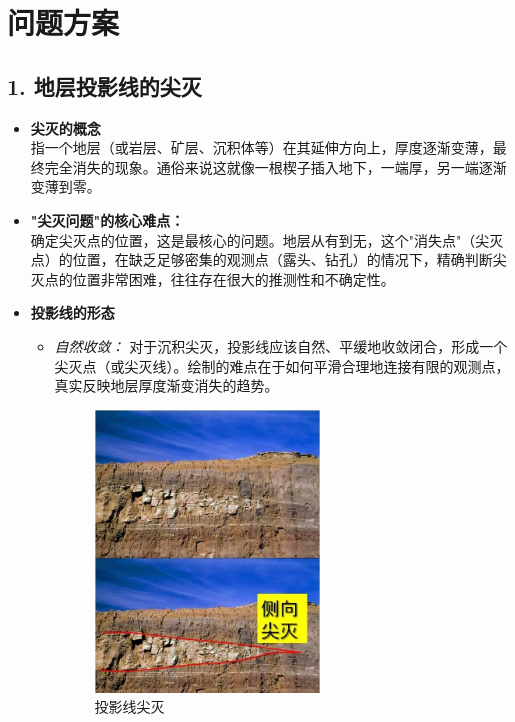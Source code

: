 \documentclass[a4paper,twoside]{ctexart}
\begin{document}
\section{问题方案}
\subsection*{1. 地层投影线的尖灭}
\begin{itemize}
  \item \textbf{尖灭的概念}\\
  指一个地层（或岩层、矿层、沉积体等）在其延伸方向上，厚度逐渐变薄，最终完全消失的现象。通俗来说这就像一根楔子插入地下，一端厚，另一端逐渐变薄到零。
  
  \item \textbf{"尖灭问题"的核心难点：}\\
  确定尖灭点的位置，这是最核心的问题。地层从有到无，这个"消失点"（尖灭点）的位置，在缺乏足够密集的观测点（露头、钻孔）的情况下，精确判断尖灭点的位置非常困难，往往存在很大的推测性和不确定性。
  
  \item \textbf{投影线的形态}
  \begin{itemize}
    \item \textit{自然收敛：} 对于沉积尖灭，投影线应该自然、平缓地收敛闭合，形成一个尖灭点（或尖灭线）。绘制的难点在于如何平滑合理地连接有限的观测点，真实反映地层厚度渐变消失的趋势。
   
    \begin{figure}[htbp]
      \centering
      \includegraphics[width=0.6\textwidth]{pic/投影线尖灭.jpg}
      \caption{投影线尖灭}
      \label{fig:投影线尖灭}
    \end{figure}
    

\end{itemize}
\end{itemize}
\end{document}

